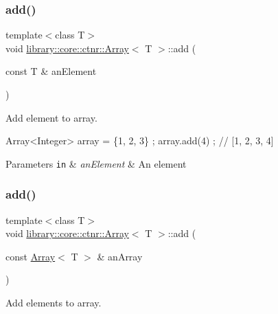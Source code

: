 \subsubsection{\texorpdfstring{add()}{add()}\hspace{0.1cm}{\footnotesize\ttfamily [1/2]}}
{\footnotesize\ttfamily template$<$class T$>$ \\
void \hyperlink{classlibrary_1_1core_1_1ctnr_1_1_array}{library\+::core\+::ctnr\+::\+Array}$<$ T $>$\+::add (\begin{DoxyParamCaption}\item[{const T \&}]{an\+Element }\end{DoxyParamCaption})}



Add element to array. 


\begin{DoxyCode}
Array<Integer> array = \{1, 2, 3\} ;
array.add(4) ; \textcolor{comment}{// [1, 2, 3, 4]}
\end{DoxyCode}



\begin{DoxyParams}[1]{Parameters}
\mbox{\tt in}  & {\em an\+Element} & An element \\
\hline
\end{DoxyParams}
\mbox{\label{classlibrary_1_1core_1_1ctnr_1_1_array_a8dd701c76ba2659ee2e438cff70fa971}} 
\subsubsection{\texorpdfstring{add()}{add()}\hspace{0.1cm}{\footnotesize\ttfamily [2/2]}}
{\footnotesize\ttfamily template$<$class T$>$ \\
void \hyperlink{classlibrary_1_1core_1_1ctnr_1_1_array}{library\+::core\+::ctnr\+::\+Array}$<$ T $>$\+::add (\begin{DoxyParamCaption}\item[{const \hyperlink{classlibrary_1_1core_1_1ctnr_1_1_array}{Array}$<$ T $>$ \&}]{an\+Array }\end{DoxyParamCaption})}



Add elements to array. 


